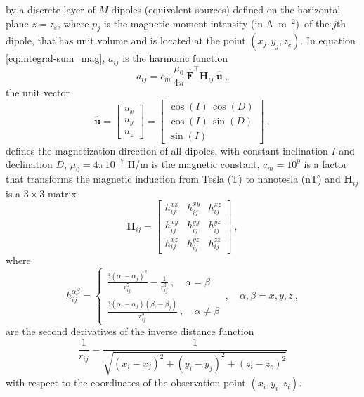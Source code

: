 \documentclass[manuscript]{geophysics}
\begin{document}
	by a discrete layer of $M$ dipoles (equivalent sources) defined on the horizontal plane $z = z_{c}$, 
	where $p_{j}$ is the magnetic moment intensity (in A~m~$^{2}$)~of the $j$th dipole, 
	that has unit volume and is located at the point $(x_{j}, y_{j}, z_{c})$. In equation
	\ref{eq:integral-sum_mag}, $a_{ij}$ is the harmonic function
	\begin{equation}
		a_{ij}
		= c_{m} \, \frac{\mu_{0}}{4\pi} \, \hat{\mathbf{F}}^{\top} \mathbf{H}_{ij} \: \hat{\mathbf{u}} \: ,
		\label{eq:aij_mag}
	\end{equation}
	the unit vector
	\begin{equation}
		\hat{\mathbf{u}} = \begin{bmatrix}
			u_x \\
			u_y \\
			u_z
		\end{bmatrix} =
		\begin{bmatrix}
			\cos(I) \, \cos(D) \\
			\cos(I) \, \sin(D) \\
			\sin(I)
		\end{bmatrix} \: ,
		\label{eq:u_hat}
	\end{equation}
	defines the magnetization direction of all dipoles, with constant inclination $I$ and declination $D$,
	$\mu_{0} = 4\pi \, 10^{-7}$ H/m is the magnetic constant, $c_{m} = 10^{9}$ is a factor that transforms
	the magnetic induction from Tesla (T) to nanotesla (nT) and $\mathbf{H}_{ij}$ is a $3 \times 3$ matrix 
	\begin{equation}
		\mathbf{H}_{ij} = \begin{bmatrix}
			h^{xx}_{ij} & h^{xy}_{ij} & h^{xz}_{ij} \\
			h^{xy}_{ij} & h^{yy}_{ij} & h^{yz}_{ij} \\
			h^{xz}_{ij} & h^{yz}_{ij} & h^{zz}_{ij}
		\end{bmatrix} \: ,
		\label{eq:Hij}
	\end{equation}
	where 
	\begin{equation}
		h^{\alpha\beta}_{ij} = 
		\begin{cases}
			\frac{3 \left( \alpha_{i} - \alpha_{j} \right)^{2}}{r_{ij}^{5}} - \frac{1}{r_{ij}^{3}} \: , \quad \alpha = \beta \\
			\frac{3 \left( \alpha_{i} - \alpha_{j} \right) \left( \beta_{i} - \beta_{j} \right)}{r_{ij}^{5}} \: , \quad \alpha \ne \beta
		\end{cases} \: , \quad \alpha, \beta = x, y, z \: ,
		\label{eq:hij_alpha_beta}
	\end{equation}
	are the second derivatives of the inverse distance function
	\begin{equation}
		\frac{1}{r_{ij}} = 
		\frac{1}{\sqrt{\left(x_{i} - x_{j} \right)^{2} + 
				\left(y_{i} - y_{j} \right)^{2} + \left(z_{i} - z_{c} \right)^{2}}}
		\label{eq:1_rij}
	\end{equation}
	with respect to the coordinates of the observation point $(x_{i}, y_{i}, z_{i})$.
	
\end{document}
